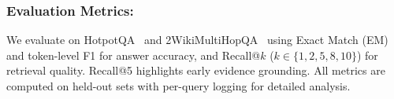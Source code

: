 \documentclass[runningheads]{llncs}
\begin{document}
\subsubsection{Evaluation Metrics:}
\noindent
We evaluate on HotpotQA~\cite{yang2018hotpotqa} and 2WikiMultiHopQA~\cite{ho2020constructing} using Exact Match (EM) and token-level F1 for answer accuracy, and Recall@$k$ ($k \in \{1,2,5,8,10\}$) for retrieval quality. Recall@5 highlights early evidence grounding. All metrics are computed on held-out sets with per-query logging for detailed analysis.

\justifying
\end{document}
